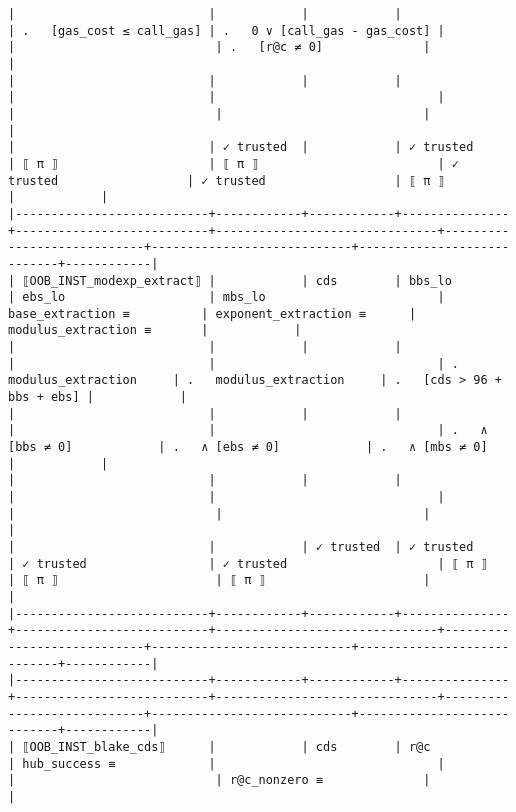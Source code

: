 \documentclass[varwidth=\maxdimen,margin=0.5cm,multi={verbatim}]{standalone}
\begin{document}
\begin{verbatim}
|                           |            |            |               | .   [gas_cost ≤ call_gas] | .   0 ∨ [call_gas - gas_cost] |                            |                            | .   [r@c ≠ 0]              |            |
|                           |            |            |               |                           |                               |                            |                            |                            |            |
|                           | ✓ trusted  |            | ✓ trusted     | ⟦ π ⟧                     | ⟦ π ⟧                         | ✓ trusted                  | ✓ trusted                  | ⟦ π ⟧                      |            |
|---------------------------+------------+------------+---------------+---------------------------+-------------------------------+----------------------------+----------------------------+----------------------------+------------|
| ⟦OOB_INST_modexp_extract⟧ |            | cds        | bbs_lo        | ebs_lo                    | mbs_lo                        | base_extraction ≡          | exponent_extraction ≡      | modulus_extraction ≡       |            |
|                           |            |            |               |                           |                               | .   modulus_extraction     | .   modulus_extraction     | .   [cds > 96 + bbs + ebs] |            |
|                           |            |            |               |                           |                               | .   ∧ [bbs ≠ 0]            | .   ∧ [ebs ≠ 0]            | .   ∧ [mbs ≠ 0]            |            |
|                           |            |            |               |                           |                               |                            |                            |                            |            |
|                           |            | ✓ trusted  | ✓ trusted     | ✓ trusted                 | ✓ trusted                     | ⟦ π ⟧                      | ⟦ π ⟧                      | ⟦ π ⟧                      |            |
|---------------------------+------------+------------+---------------+---------------------------+-------------------------------+----------------------------+----------------------------+----------------------------+------------|
|---------------------------+------------+------------+---------------+---------------------------+-------------------------------+----------------------------+----------------------------+----------------------------+------------|
| ⟦OOB_INST_blake_cds⟧      |            | cds        | r@c           | hub_success ≡             |                               |                            |                            | r@c_nonzero ≡              |            |

\end{verbatim}
\end{document}
